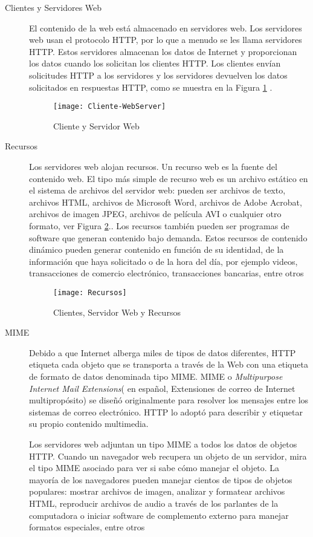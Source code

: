 \begin{description}
	\item[Clientes y Servidores Web]
	El contenido de la  web está almacenado en \gls{servidores web}. Los servidores web usan el protocolo HTTP, por lo que a menudo se les llama servidores HTTP. Estos servidores almacenan los datos de Internet y proporcionan los datos cuando los solicitan los clientes HTTP. Los clientes envían solicitudes HTTP a los servidores y los servidores devuelven los datos solicitados en respuestas HTTP, como se muestra en la Figura \ref{fig:CSweb} . 
	
	\begin{figure} %
		\texttt{[image: Cliente-WebServer]}
		\caption{Cliente y Servidor Web }
		\label{fig:CSweb}
	\end{figure}
	
	
	\item[Recursos]
	Los servidores web alojan \gls{recursos}. Un recurso web es la fuente del contenido web. El tipo más simple de recurso web es un archivo estático en el sistema de archivos del servidor web: pueden ser archivos de texto, archivos HTML, archivos de Microsoft Word, archivos de Adobe Acrobat, archivos de imagen JPEG, archivos de película AVI o cualquier otro formato, ver Figura \ref{fig:CS-Recursos}..
	Los recursos también pueden ser programas de software que generan contenido bajo demanda. Estos recursos de contenido dinámico pueden generar contenido en función de su identidad, de la información que haya solicitado o de la hora del día, por ejemplo videos, transacciones de comercio electrónico, transacciones bancarias, entre otros
	
		\begin{figure} %
			\texttt{[image: Recursos]}
			\caption{Clientes, Servidor Web y Recursos }
			\label{fig:CS-Recursos}
		\end{figure}
	

	\item[MIME]
	Debido a que Internet alberga  miles de tipos de datos diferentes, HTTP etiqueta  cada objeto que se transporta a través de la Web con una etiqueta de formato de datos denominada tipo MIME. \gls{MIME} o \textit{Multipurpose Internet Mail Extensions}( en español, Extensiones de correo de Internet multipropósito) se diseñó originalmente para resolver los mensajes entre los sistemas de correo electrónico. HTTP lo adoptó para describir y etiquetar su propio contenido multimedia.

	Los servidores web adjuntan un tipo MIME a todos los datos de objetos HTTP. Cuando un navegador web recupera un objeto de un servidor, mira el tipo MIME asociado para ver si sabe cómo manejar el objeto. La mayoría de los navegadores pueden manejar cientos de tipos de objetos populares: mostrar archivos de imagen, analizar y formatear archivos HTML, reproducir archivos de audio a través de los parlantes de la computadora o iniciar software de complemento externo para manejar formatos especiales, entre otros




	
\end{description}
